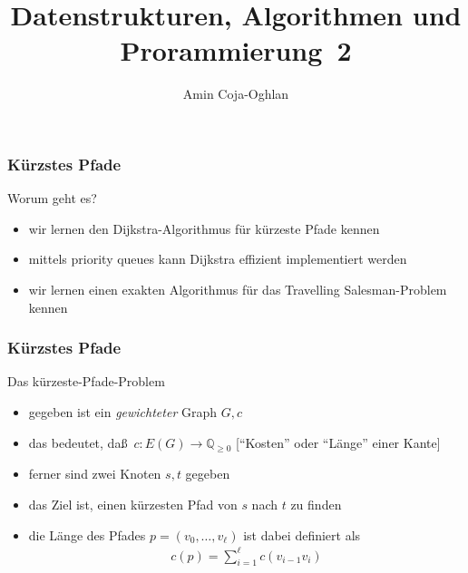 \documentclass[aspectratio=1610, 11pt]{beamer}
\title{Datenstrukturen, Algorithmen und Prorammierung~2}
\author[A.~Coja-Oghlan]{Amin Coja-Oghlan}
\institute[DAP2]{Lehrstuhl Informatik 2\\Fakult\"at f\"ur Informatik}
\newcommand\QQ{\mathbb Q}
\newcommand{\mytitle}{K\"urzstes Pfade}
\begin{document}
\frame[plain]{\titlepage}

\begin{frame}\frametitle{\mytitle}
	\begin{exampleblock}{Worum geht es?}
		\begin{itemize}
			\item wir lernen den Dijkstra-Algorithmus f\"ur k\"urzeste Pfade kennen
			\item mittels priority queues kann Dijkstra effizient implementiert  werden
			\item wir lernen einen exakten Algorithmus f\"ur das Travelling Salesman-Problem kennen
		\end{itemize}
	\end{exampleblock}
\end{frame}

\begin{frame}\frametitle{\mytitle}
	\begin{block}{Das k\"urzeste-Pfade-Problem}
 		\begin{itemize}
			\item gegeben ist ein \emph{gewichteter} Graph $G,c$
			\item das bedeutet, da\ss\ $c:E(G)\to\QQ_{\geq0}$ \hfill[``Kosten'' oder ``L\"ange'' einer Kante]
			\item ferner sind zwei Knoten $s,t$ gegeben
			\item das Ziel ist, einen k\"urzesten Pfad von $s$ nach $t$ zu finden
			\item die \alert{L\"ange} des Pfades $p=(v_0,\ldots,v_\ell)$ ist dabei definiert als
				\begin{align*}
					c(p)=\sum_{i=1}^\ell c(v_{i-1}v_i)
				\end{align*}
		\end{itemize}
	\end{block}
\end{frame}
\end{document}
